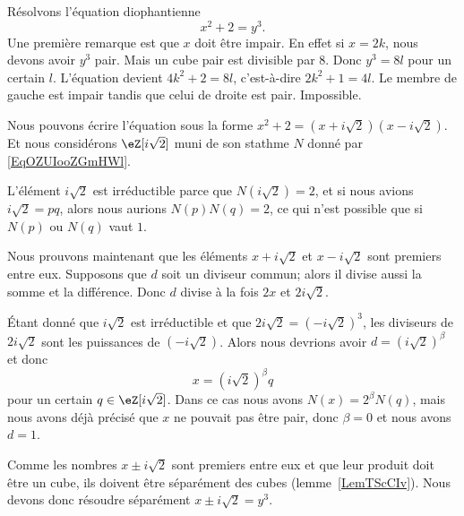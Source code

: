 \begin{example}     \label{ExmuQisZU}
	Résolvons l'équation diophantienne
	\begin{equation}
		x^2+2=y^3.
	\end{equation}
	Une première remarque est que \( x\) doit être impair. En effet si \( x=2k\), nous devons avoir \( y^3\) pair. Mais un cube pair est divisible par \( 8\). Donc \( y^3=8l\) pour un certain \( l\). L'équation devient \( 4k^2+2=8l\), c'est-à-dire \( 2k^2+1=4l\). Le membre de gauche est impair tandis que celui de droite est pair. Impossible.

	Nous pouvons écrire l'équation sous la forme \( x^2+2=(x+i\sqrt{2})(x-i\sqrt{2})\). Et nous considérons \( \eZ[i\sqrt{2}]\) muni de son stathme \( N\) donné par \eqref{EqOZUIooZGmHWl}.

	L'élément \( i\sqrt{2}\) est irréductible parce que \( N(i\sqrt{2})=2\), et si nous avions \( i\sqrt{2}=pq\), alors nous aurions \( N(p)N(q)=2\), ce qui n'est possible que si \( N(p)\) ou \( N(q)\) vaut \( 1\).

	Nous prouvons maintenant que les éléments \( x+i\sqrt{2}\) et \( x-i\sqrt{2}\) sont premiers entre eux. Supposons que \( d\) soit un diviseur commun; alors il divise aussi la somme et la différence. Donc \( d\) divise à la fois \( 2x\) et \( 2i\sqrt{2}\).

	Étant donné que \( i\sqrt{2}\) est irréductible et que \( 2i\sqrt{2}=(-i\sqrt{2})^3\), les diviseurs de \( 2i\sqrt{2}\) sont les puissances de \( (-i\sqrt{2})\). Alors nous devrions avoir \( d=(i\sqrt{2})^{\beta}\) et donc
	\begin{equation}
		x=(i\sqrt{2})^{\beta}q
	\end{equation}
	pour un certain \( q\in\eZ[i\sqrt{2}]\). Dans ce cas nous avons \( N(x)=2^{\beta}N(q)\), mais nous avons déjà précisé que \( x\) ne pouvait pas être pair, donc \( \beta=0\) et nous avons \( d=1\).

	Comme les nombres \( x\pm i\sqrt{2}\) sont premiers entre eux et que leur produit doit être un cube, ils doivent être séparément des cubes (lemme~\ref{LemTScCIv}). Nous devons donc résoudre séparément \( x\pm i\sqrt{2}=y^3\).


\end{example}
